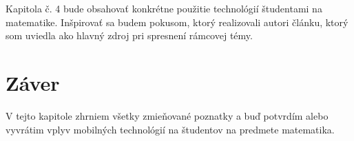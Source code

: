 \documentclass[10pt,twoside,slovak,a4paper]{article}
\begin{document}
Kapitola č. 4 bude obsahovať konkrétne použitie technológií študentami na matematike. Inšpirovať sa budem pokusom, ktorý realizovali autori článku, ktorý som uviedla ako hlavný zdroj pri spresnení rámcovej témy.

\section{Záver} \label{zaver} 
V tejto kapitole zhrniem všetky zmieňované poznatky a buď potvrdím alebo vyvrátim vplyv mobilných technológií na študentov na predmete matematika.





\end{document}
